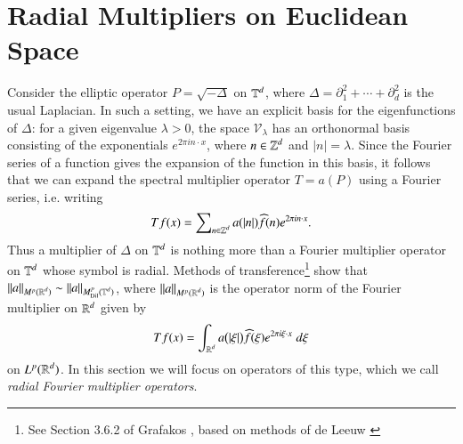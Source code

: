 %

\chapter{Radial Multipliers on Euclidean Space} \label{sec:radmult}

Consider the elliptic operator $P = \sqrt{-\Delta}$ on $\operatorname{\mathbb{T}}^d$, where $\Delta = \partial_1^2 + \cdots + \partial_d^2$ is the usual Laplacian. In such a setting, we have an explicit basis for the eigenfunctions of $\Delta$: for a given eigenvalue $\lambda > 0$, the space $\mathcal{V}_\lambda$ has an orthonormal basis consisting of the exponentials $e^{2 \pi i n \cdot x}$, where $n \in \operatorname{\mathbb{Z}}^d$ and $|n| = \lambda$. Since the Fourier series of a function gives the expansion of the function in this basis, it follows that we can expand the spectral multiplier operator $T = a(P)$ using a Fourier series, i.e. writing
%
\begin{equation}
  Tf(x) = \sum\nolimits_{n \in \operatorname{\mathbb{Z}}^d} a( |n| ) \widehat{f}(n) e^{2 \pi i n \cdot x}.
\end{equation}
%
Thus a multiplier of $\Delta$ on $\operatorname{\mathbb{T}}^d$ is nothing more than a Fourier multiplier operator on $\operatorname{\mathbb{T}}^d$ whose symbol is radial. Methods of transference\footnote{See Section 3.6.2 of Grafakos \cite{Grafakos}, based on methods of de Leeuw \cite{deLeeuw}} show that $\| a \|_{M^p(\operatorname{\mathbb{R}}^d)} \sim \| a \|_{M^p_{\text{Dil}}(\operatorname{\mathbb{T}}^d)}$, where $\| a \|_{M^p(\operatorname{\mathbb{R}}^d)}$ is the operator norm of the Fourier multiplier on $\operatorname{\mathbb{R}}^d$ given by
%
\begin{equation}
  Tf(x) = \int_{\operatorname{\mathbb{R}}^d} a \big(|\xi| \big) \widehat{f}(\xi) e^{2 \pi i \xi \cdot x}\; d\xi 
\end{equation}
%
on $L^p(\operatorname{\mathbb{R}}^d)$. In this section we will focus on operators of this type, which we call \emph{radial Fourier multiplier operators}.

